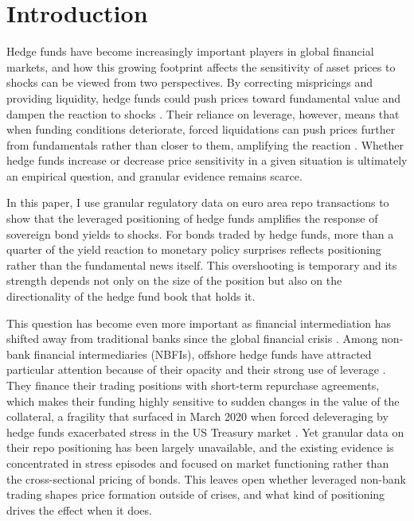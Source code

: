 \documentclass[english, 11pt, oneside]{article}
\begin{document}
\section{Introduction}
Hedge funds have become increasingly important players in global financial markets, and how this growing footprint affects the sensitivity of asset prices to shocks can be viewed from two perspectives. By correcting mispricings and providing liquidity, hedge funds could push prices toward fundamental value and dampen the reaction to shocks \citep{gromb2002, cao2018}. Their reliance on leverage, however, means that when funding conditions deteriorate, forced liquidations can push prices further from fundamentals rather than closer to them, amplifying the reaction \citep{shleifer1997, brunnermeier2009, geanakoplos2010}. Whether hedge funds increase or decrease price sensitivity in a given situation is ultimately an empirical question, and granular evidence remains scarce. 

In this paper, I use granular regulatory data on euro area repo transactions to show that the leveraged positioning of hedge funds amplifies the response of sovereign bond yields to shocks. For bonds traded by hedge funds, more than a quarter of the yield reaction to monetary policy surprises reflects positioning rather than the fundamental news itself. This overshooting is temporary and its strength depends not only on the size of the position but also on the directionality of the hedge fund book that holds it.

This question has become even more important as financial intermediation has shifted away from traditional banks since the global financial crisis \citep{pelizzon2025nbfi}. Among non-bank financial intermediaries (NBFIs), offshore hedge funds have attracted particular attention because of their opacity and their strong use of leverage \citep{barth2025cross}. They finance their trading positions with short-term repurchase agreements, which makes their funding highly sensitive to sudden changes in the value of the collateral, a fragility that surfaced in March 2020 when forced deleveraging by hedge funds exacerbated stress in the US Treasury market \citep{barth2025, kruttli2025, aramonte2023}. Yet granular data on their repo positioning has been largely unavailable, and the existing evidence is concentrated in stress episodes and focused on market functioning rather than the cross-sectional pricing of bonds. This leaves open whether leveraged non-bank trading shapes price formation outside of crises, and what kind of positioning drives the effect when it does.
\end{document}

